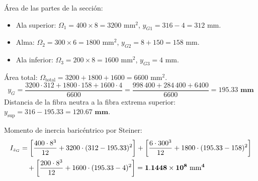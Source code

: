 {\begin{center}
{%
        }
    \end{center}

    \tcblower


    Área de las partes de la sección:
    \begin{itemize}
        \item Ala superior: $\Omega_1 = 400 \times 8 = 3200\text{ mm}^2$, $y_{G1} = 316 - 4 = 312\text{ mm}$.
        \item Alma: $\Omega_2 = 300 \times 6 = 1800\text{ mm}^2$, $y_{G2} = 8 + 150 = 158\text{ mm}$.
        \item Ala inferior: $\Omega_3 = 200 \times 8 = 1600\text{ mm}^2$, $y_{G3} = 4\text{ mm}$.
    \end{itemize}
    Área total: $\Omega_{\text{total}} = 3200 + 1800 + 1600 = 6600\text{ mm}^2$.
    \begin{equation}
        y_{G} = \frac{3200 \cdot 312 + 1800 \cdot 158 + 1600 \cdot 4}{6600} = \frac{998\,400 + 284\,400 + 6400}{6600} = \mathbf{195.33\text{ mm}}
    \end{equation}
    Distancia de la fibra neutra a la fibra extrema superior: $y_{\text{sup}} = 316 - 195.33 = \mathbf{120.67\text{ mm}}$.

    Momento de inercia baricéntrico por Steiner:
    \begin{align}
        I_{z_G} & = \left[\frac{400 \cdot 8^3}{12} + 3200 \cdot (312 - 195.33)^2\right] + \left[\frac{6 \cdot 300^3}{12} + 1800 \cdot (195.33 - 158)^2\right] \notag \\
                & \quad + \left[\frac{200 \cdot 8^3}{12} + 1600 \cdot (195.33 - 4)^2\right] = \mathbf{1.1448 \times 10^8\text{ mm}^4}
    \end{align}


}
